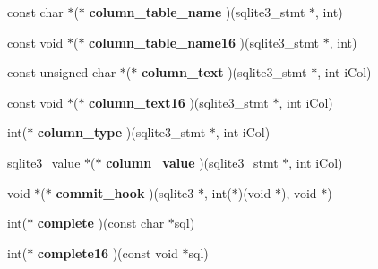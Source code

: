 \begin{DoxyCompactItemize}
const char $\ast$($\ast$ {\bfseries column\+\_\+table\+\_\+name} )(sqlite3\+\_\+stmt $\ast$, int)
\item 
\mbox{\label{structsqlite3__api__routines_a9b19d2cacecce0a09c5bdcffc6e44197}} 
const void $\ast$($\ast$ {\bfseries column\+\_\+table\+\_\+name16} )(sqlite3\+\_\+stmt $\ast$, int)
\item 
\mbox{\label{structsqlite3__api__routines_a0857bdde632d86319b569c64668bed69}} 
const unsigned char $\ast$($\ast$ {\bfseries column\+\_\+text} )(sqlite3\+\_\+stmt $\ast$, int i\+Col)
\item 
\mbox{\label{structsqlite3__api__routines_a893fc55c1762d1bb927d4821a1340dd9}} 
const void $\ast$($\ast$ {\bfseries column\+\_\+text16} )(sqlite3\+\_\+stmt $\ast$, int i\+Col)
\item 
\mbox{\label{structsqlite3__api__routines_a1bfa18703e814caf9b940bd89247fde5}} 
int($\ast$ {\bfseries column\+\_\+type} )(sqlite3\+\_\+stmt $\ast$, int i\+Col)
\item 
\mbox{\label{structsqlite3__api__routines_a051de47b5f1331319af6b6c9062e8b32}} 
sqlite3\+\_\+value $\ast$($\ast$ {\bfseries column\+\_\+value} )(sqlite3\+\_\+stmt $\ast$, int i\+Col)
\item 
\mbox{\label{structsqlite3__api__routines_a7a0ba7cc6db07bf2d0db7e0d5234095f}} 
void $\ast$($\ast$ {\bfseries commit\+\_\+hook} )(sqlite3 $\ast$, int($\ast$)(void $\ast$), void $\ast$)
\item 
\mbox{\label{structsqlite3__api__routines_a4bd1a90b2a40c58ecc1c2ceb67be48f5}} 
int($\ast$ {\bfseries complete} )(const char $\ast$sql)
\item 
\mbox{\label{structsqlite3__api__routines_ae3e27f61b6c43cf549360f1bb8b3b591}} 
int($\ast$ {\bfseries complete16} )(const void $\ast$sql)
\item 
\mbox{\label{structsqlite3__api__routines_aed840be5b7cc7add4f21ba88f1981f58}} 

\end{DoxyCompactItemize}
